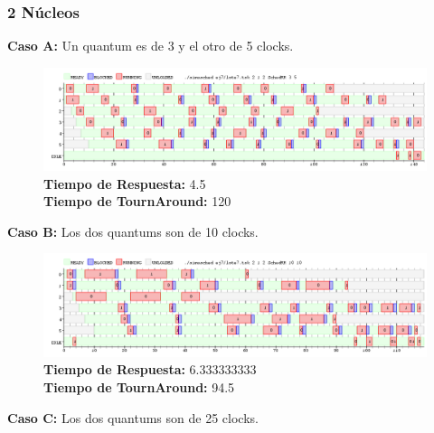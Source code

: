 \documentclass[a4paper]{article}
\begin{document}
\newpage	
	\subsubsection*{2 N\'ucleos}
	
	\textbf{Caso A:} Un quantum es de 3 y el otro de 5 clocks.

		 \begin{figure}[h!]
   \begin{center}
 	\includegraphics[scale=0.5]{imagenes/ej7/2nucleoA.png}
 	\textbf{Tiempo de Respuesta:} 4.5 \\
 	\textbf{Tiempo de TournAround:} 120 \\
   \end{center}
 \end{figure} 
 	
	\textbf{Caso B:} Los dos quantums son de 10 clocks.

		 \begin{figure}[h!]
   \begin{center}
 	\includegraphics[scale=0.5]{imagenes/ej7/2nucleoB.png}
 	\textbf{Tiempo de Respuesta:} 6.333333333\\
 	\textbf{Tiempo de TournAround:} 94.5\\
   \end{center}
 \end{figure} 
 	
	\textbf{Caso C:} Los dos quantums son de 25 clocks.
\end{document}
